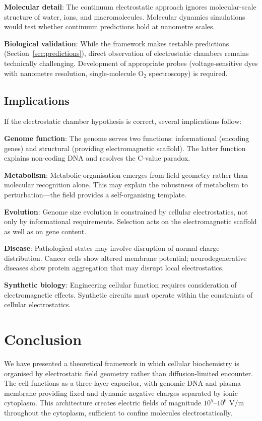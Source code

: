 \documentclass[twocolumn,10pt,aps,prd,superscriptaddress,floatfix,nofootinbib]{revtex4-2}
\theoremstyle{remark}
\begin{document}
\textbf{Molecular detail}: The continuum electrostatic approach ignores molecular-scale structure of water, ions, and macromolecules. Molecular dynamics simulations would test whether continuum predictions hold at nanometre scales.

\textbf{Biological validation}: While the framework makes testable predictions (Section~\ref{sec:predictions}), direct observation of electrostatic chambers remains technically challenging. Development of appropriate probes (voltage-sensitive dyes with nanometre resolution, single-molecule O$_2$ spectroscopy) is required.

\subsection{Implications}

If the electrostatic chamber hypothesis is correct, several implications follow:

\textbf{Genome function}: The genome serves two functions: informational (encoding genes) and structural (providing electromagnetic scaffold). The latter function explains non-coding DNA and resolves the C-value paradox.

\textbf{Metabolism}: Metabolic organisation emerges from field geometry rather than molecular recognition alone. This may explain the robustness of metabolism to perturbation---the field provides a self-organising template.

\textbf{Evolution}: Genome size evolution is constrained by cellular electrostatics, not only by informational requirements. Selection acts on the electromagnetic scaffold as well as on gene content.

\textbf{Disease}: Pathological states may involve disruption of normal charge distribution. Cancer cells show altered membrane potential; neurodegenerative diseases show protein aggregation that may disrupt local electrostatics.

\textbf{Synthetic biology}: Engineering cellular function requires consideration of electromagnetic effects. Synthetic circuits must operate within the constraints of cellular electrostatics.

\section{Conclusion}

We have presented a theoretical framework in which cellular biochemistry is organised by electrostatic field geometry rather than diffusion-limited encounter. The cell functions as a three-layer capacitor, with genomic DNA and plasma membrane providing fixed and dynamic negative charges separated by ionic cytoplasm. This architecture creates electric fields of magnitude $10^5$--$10^6$ V/m throughout the cytoplasm, sufficient to confine molecules electrostatically.
\end{document}
